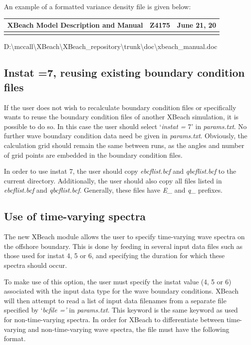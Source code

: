 An example of a formatted variance density file is given below:

\begin{tabular}{|p{1.5in}|p{1.5in}|p{1.5in}|} \hline 
XBeach Model Description and Manual & Z4175 & June 21, 20 \\ \hline 
&  &  \\ \hline 
\end{tabular}

D:\textbackslash mccall\textbackslash XBeach\textbackslash XBeach\_repository\textbackslash trunk\textbackslash doc\textbackslash xbeach\_manual.doc


\subsection{Instat =7, reusing existing boundary condition files}

If the user does not wish to recalculate boundary condition files or specifically wants to reuse the boundary condition files of another XBeach simulation, it is possible to do so. In this case the user should select `\textit{instat =} 7' in \textit{params.txt}. No further wave boundary condition data need be given in \textit{params.txt}. Obviously, the calculation grid should remain the same between runs, as the angles and number of grid points are embedded in the boundary condition files.

In order to use instat 7, the user should copy \textit{ebcflist.bcf} and \textit{qbcflist.bcf} to the current directory. Additionally, the user should also copy all files listed in \textit{ebcflist.bcf} and \textit{qbcflist.bcf}. Generally, these files have \textit{E\_} and \textit{q\_} prefixes.


\subsection{ Use of time-varying spectra}

The new XBeach module allows the user to specify time-varying wave spectra on the offshore boundary. This is done by feeding in several input data files such as those used for instat 4, 5 or 6, and specifying the duration for which these spectra should occur.

To make use of this option, the user must specify the instat value (4, 5 or 6) associated with the input data type for the wave boundary conditions. XBeach will then attempt to read a list of input data filenames from a separate file specified by `\textit{bcfile ='} in \textit{params.txt}. This keyword is the same keyword as used for non-time-varying spectra. In order for XBeach to differentiate between time-varying and non-time-varying wave spectra, the file must have the following format.

